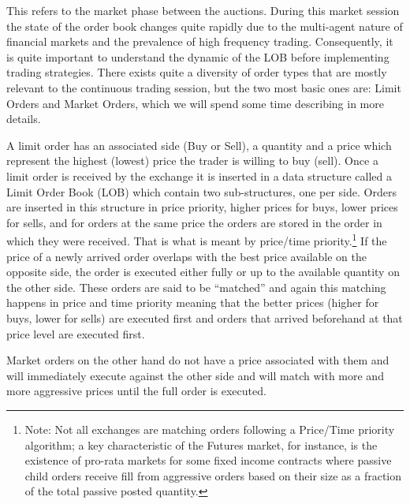 This refers to the market phase between the auctions. During this market session  the state of the order book changes quite rapidly due to the multi-agent nature of financial markets and the prevalence of high frequency trading. Consequently, it is quite important to understand the dynamic of the LOB before implementing trading strategies. There exists quite a diversity of order types that are mostly relevant to the continuous trading session, but the two most basic ones are: Limit Orders and Market Orders, which we will spend some time describing in more details. \twomedskip


A limit order has an associated side (Buy or Sell), a quantity and a price which represent the highest (lowest) price the trader is willing to buy (sell). Once a limit order is received by the exchange it is inserted in a data structure called a Limit Order Book (LOB) which contain two sub-structures, one per side. Orders are inserted in this structure in price priority, higher prices for buys, lower prices for sells, and for orders at the same price the orders are stored in the order in which they were received. That is what is meant by price/time priority.\footnote{Note: Not all exchanges are matching orders following a Price/Time priority algorithm; a key characteristic of the Futures market, for instance, is the existence of pro-rata markets for some fixed income contracts where passive child orders receive fill from aggressive orders based on their size as a fraction of the total passive posted quantity.} If the price of a newly arrived order overlaps with the best price available on the opposite side, the order is executed either fully or up to the available quantity on the other side. These orders are said to be ``matched'' and again this matching happens in price and time priority meaning that the better prices (higher for buys, lower for sells) are executed first and orders that arrived beforehand at that price level are executed first. 


Market orders on the other hand do not have a price associated with them and will immediately execute against the other side and will match with more and more aggressive prices until the full order is executed. 


